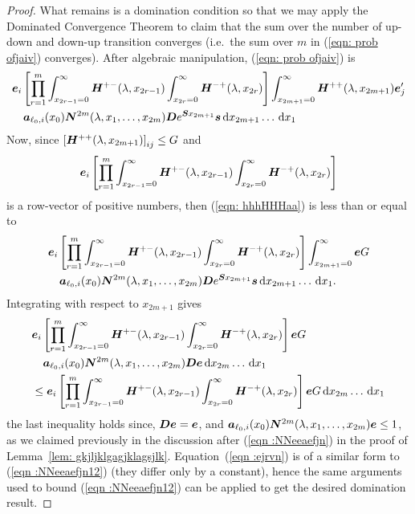 \begin{proof}
	What remains is a domination condition so that we may apply the Dominated Convergence Theorem to claim that the sum over the number of up-down and down-up transition converges (i.e.~the sum over \(m\) in (\ref{eqn: prob ofjaiv}) converges). After algebraic manipulation, (\ref{eqn: prob ofjaiv}) is 
	\begin{align}
			&\boldsymbol e_i \left[\prod_{r=1}^m\int_{x_{2r-1}=0}^\infty \boldsymbol H^{+-}(\lambda,x_{2r-1})\nonumber
			\int_{x_{2r}=0}^\infty \boldsymbol H^{-+}(\lambda,x_{2r}) \right]
			\int_{x_{2m+1}=0}^\infty \boldsymbol H^{++}(\lambda,x_{2m+1}) \boldsymbol e_j'{}
		\\&\quad\boldsymbol a_{\ell_0,i}(x_0) \boldsymbol N^{2m}(\lambda,x_1,\dots,x_{2m})\boldsymbol De^{\boldsymbol Sx_{2m+1}} {\boldsymbol s} \, \mathrm{d} x_{2m+1} \dots \, \mathrm{d} x_1 \label{eqn: hhhHHHaa}  
	\end{align}
	Now, since \(\left[\boldsymbol H^{++}(\lambda,x_{2m+1})\right]_{ij}\leq G\) and  
	\[\boldsymbol e_i \left[\prod_{r=1}^m\int_{x_{2r-1}=0}^\infty \boldsymbol H^{+-}(\lambda,x_{2r-1})\nonumber
	\int_{x_{2r}=0}^\infty \boldsymbol H^{-+}(\lambda,x_{2r}) \right]\] 
	is a row-vector of positive numbers, then (\ref{eqn: hhhHHHaa}) is less than or equal to 
	\begin{align}
		&\boldsymbol e_i \left[\prod_{r=1}^m\int_{x_{2r-1}=0}^\infty \boldsymbol H^{+-}(\lambda,x_{2r-1})\nonumber
		\int_{x_{2r}=0}^\infty \boldsymbol H^{-+}(\lambda,x_{2r}) \right]
		\int_{x_{2m+1}=0}^\infty  \boldsymbol e G
		\\&\quad\boldsymbol a_{\ell_0,i}(x_0) \boldsymbol N^{2m}(\lambda,x_1,\dots,x_{2m})\boldsymbol De^{\boldsymbol Sx_{2m+1}}{\boldsymbol s} \, \mathrm{d} x_{2m+1}\dots \, \mathrm{d} x_1.\nonumber
	\end{align}
	Integrating with respect to \(x_{2m+1}\) gives
	\begin{align}
		&\boldsymbol e_i \left[\prod_{r=1}^m\int_{x_{2r-1}=0}^\infty \boldsymbol H^{+-}(\lambda,x_{2r-1})\nonumber
		\int_{x_{2r}=0}^\infty \boldsymbol H^{-+}(\lambda,x_{2r}) \right]
		 \boldsymbol e G
		\\&\quad\boldsymbol a_{\ell_0,i}(x_0) \boldsymbol N^{2m}(\lambda,x_1,\dots,x_{2m})\boldsymbol D {\boldsymbol e}\, \mathrm{d} x_{2m} \dots \, \mathrm{d} x_1\nonumber
		\\&\leq\boldsymbol e_i \left[\prod_{r=1}^m\int_{x_{2r-1}=0}^\infty \boldsymbol H^{+-}(\lambda,x_{2r-1})
		\int_{x_{2r}=0}^\infty \boldsymbol H^{-+}(\lambda,x_{2r}) \right]
		 \boldsymbol e G \, \mathrm{d} x_{2m}\dots \, \mathrm{d} x_1 \label{eqn :ejrvn}
	\end{align}
	the last inequality holds since, \(\boldsymbol D{\boldsymbol e}=\boldsymbol e\), and \(\boldsymbol a_{\ell_0,i}(x_0) \boldsymbol N^{2m}(\lambda,x_1,\dots,x_{2m}){\boldsymbol e}\leq 1\), as we claimed previously in the discussion after (\ref{eqn :NNeeaefjn}) in the proof of Lemma~\ref{lem: gkjljklgagjklagsjlk}. Equation~(\ref{eqn :ejrvn}) is of a similar form to (\ref{eqn :NNeeaefjn12}) (they differ only by a constant), hence the same arguments used to bound (\ref{eqn :NNeeaefjn12}) can be applied to get the desired domination result. 


\end{proof}
